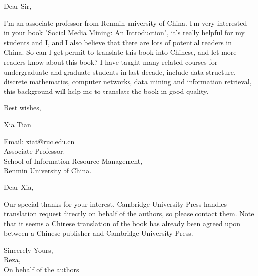 Dear Sir,

I'm an associate professor from Renmin university of China. I'm very interested in your book "Social Media Mining: An Introduction", it's really helpful for my students and I, and I also believe that there are lots of potential readers in China. So can I get permit to translate this book into Chinese, and let more readers know about this book? I have taught many related courses for undergraduate and graduate students in last decade, include data structure, discrete mathematics, computer networks, data mining and information retrieval, this background will help me to translate the book in good quality.

Best wishes,

\begin{flushright}
Xia Tian

Email: xiat@ruc.edu.cn \\
Associate Professor, \\ 
School of Information Resource Management, \\
Renmin University of China.
\end{flushright}


Dear Xia,

Our special thanks for your interest. Cambridge University Press handles translation request directly on behalf of the authors, so please contact them. Note that it seems a Chinese translation of the book has already been agreed upon between a Chinese publisher and Cambridge University Press.

Sincerely Yours, \\
Reza, \\
On behalf of the authors 

